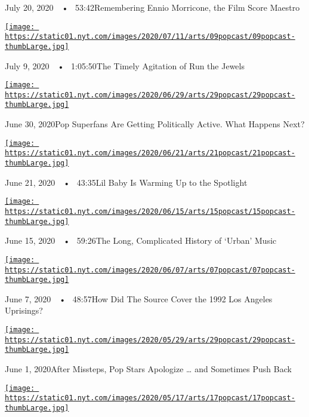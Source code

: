 July 20, 2020~~•~ 53:42Remembering Ennio Morricone, the Film Score
Maestro

\href{https://www.nytimes.com/2020/07/09/arts/music/popcast-run-the-jewels.html?action=click\&module=audio-series-bar\&region=header\&pgtype=Article}{\texttt{[image: https://static01.nyt.com/images/2020/07/11/arts/09popcast/09popcast-thumbLarge.jpg]}}

July 9, 2020~~•~ 1:05:50The Timely Agitation of Run the Jewels

\href{https://www.nytimes.com/2020/06/30/arts/music/popcast-superfans-politics.html?action=click\&module=audio-series-bar\&region=header\&pgtype=Article}{\texttt{[image: https://static01.nyt.com/images/2020/06/29/arts/29popcast/29popcast-thumbLarge.jpg]}}

June 30, 2020Pop Superfans Are Getting Politically Active. What Happens
Next?

\href{https://www.nytimes.com/2020/06/21/arts/music/popcast-lil-baby.html?action=click\&module=audio-series-bar\&region=header\&pgtype=Article}{\texttt{[image: https://static01.nyt.com/images/2020/06/21/arts/21popcast/21popcast-thumbLarge.jpg]}}

June 21, 2020~~•~ 43:35Lil Baby Is Warming Up to the Spotlight

\href{https://www.nytimes.com/2020/06/15/arts/music/popcast-urban-music.html?action=click\&module=audio-series-bar\&region=header\&pgtype=Article}{\texttt{[image: https://static01.nyt.com/images/2020/06/15/arts/15popcast/15popcast-thumbLarge.jpg]}}

June 15, 2020~~•~ 59:26The Long, Complicated History of `Urban' Music

\href{https://www.nytimes.com/2020/06/07/arts/music/popcast-the-source-rodney-king.html?action=click\&module=audio-series-bar\&region=header\&pgtype=Article}{\texttt{[image: https://static01.nyt.com/images/2020/06/07/arts/07popcast/07popcast-thumbLarge.jpg]}}

June 7, 2020~~•~ 48:57How Did The Source Cover the 1992 Los Angeles
Uprisings?

\href{https://www.nytimes.com/2020/06/01/arts/music/popcast-lana-del-rey-doja-cat-apologies.html?action=click\&module=audio-series-bar\&region=header\&pgtype=Article}{\texttt{[image: https://static01.nyt.com/images/2020/05/29/arts/29popcast/29popcast-thumbLarge.jpg]}}

June 1, 2020After Missteps, Pop Stars Apologize \ldots{} and Sometimes
Push Back

\href{https://www.nytimes.com/2020/05/18/arts/music/popcast-doja-cat.html?action=click\&module=audio-series-bar\&region=header\&pgtype=Article}{\texttt{[image: https://static01.nyt.com/images/2020/05/17/arts/17popcast/17popcast-thumbLarge.jpg]}}

